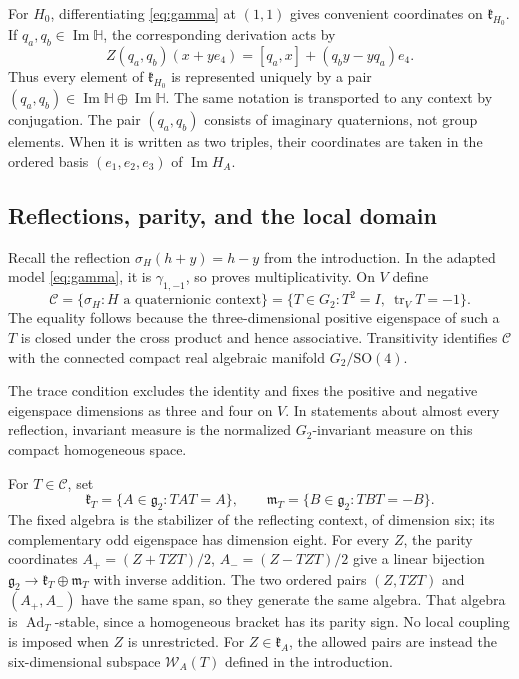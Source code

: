 \documentclass[11pt,a4paper]{article}
\newcommand{\HH}{\mathbb H}
\newcommand{\SO}{\mathrm{SO}}
\newcommand{\Ad}{\operatorname{Ad}}
\begin{document}
For $H_0$, differentiating \eqref{eq:gamma} at $(1,1)$ gives convenient coordinates on $\mathfrak k_{H_0}$.  If $q_a,q_b\in\operatorname{Im}\HH$, the corresponding derivation acts by
\[
Z(q_a,q_b)(x+ye_4)=[q_a,x]+(q_by-yq_a)e_4.
\]
Thus every element of $\mathfrak k_{H_0}$ is represented uniquely by a pair $(q_a,q_b)\in\operatorname{Im}\HH\oplus\operatorname{Im}\HH$.  The same notation is transported to any context by conjugation.  The pair $(q_a,q_b)$ consists of imaginary quaternions, not group elements.  When it is written as two triples, their coordinates are taken in the ordered basis $(e_1,e_2,e_3)$ of $\operatorname{Im}H_A$.

\subsection{Reflections, parity, and the local domain}\label{subsec:parity-domain}
Recall the reflection $\sigma_H(h+y)=h-y$ from the introduction.  In the adapted model \eqref{eq:gamma}, it is $\gamma_{1,-1}$, so  proves multiplicativity.  On $V$ define
\[
\mathscr C=\{\sigma_H:H\text{ a quaternionic context}\}
 =\{T\in G_2:T^2=I,\ \operatorname{tr}_V T=-1\}.
\]
The equality follows because the three-dimensional positive eigenspace of such a $T$ is closed under the cross product and hence associative.  Transitivity identifies $\mathscr C$ with the connected compact real algebraic manifold $G_2/\SO(4)$.

The trace condition excludes the identity and fixes the positive and negative eigenspace dimensions as three and four on $V$.  In statements about almost every reflection, invariant measure is the normalized $G_2$-invariant measure on this compact homogeneous space.  


For $T\in\mathscr C$, set
\[
\mathfrak k_T=\{A\in\mathfrak g_2:TAT=A\},\qquad
\mathfrak m_T=\{B\in\mathfrak g_2:TBT=-B\}.
\]
The fixed algebra is the stabilizer of the reflecting context, of dimension six; its complementary odd eigenspace has dimension eight.
For every $Z$, the parity coordinates $A_+=(Z+TZT)/2$, $A_-=(Z-TZT)/2$ give a linear bijection
$\mathfrak g_2\to\mathfrak k_T\oplus\mathfrak m_T$ with inverse addition.
The two ordered pairs $(Z,TZT)$ and $(A_+,A_-)$ have the same span, so they generate the same algebra.
That algebra is $\Ad_T$-stable, since a homogeneous bracket has its parity sign.
No local coupling is imposed when $Z$ is unrestricted.
For $Z\in\mathfrak k_A$, the allowed pairs are instead the six-dimensional subspace $\mathcal W_A(T)$ defined in the introduction.
\end{document}
